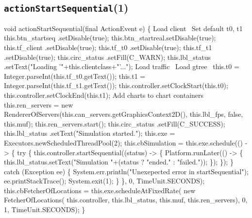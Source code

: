 \subsection{\texttt{actionStartSequential}(1)}
\nwenddocs{}\endmoddef{}
void actionStartSequential(final ActionEvent e) \{
  \LA{}Load client~{\nwtagstyle{}}\RA{}
  \LA{}Set default t0, t1~{\nwtagstyle{}}\RA{}
  this.btn_startseq .setDisable(true);
  this.btn_startreal.setDisable(true);
  this.tf_client     .setDisable(true);
  this.tf_t0        .setDisable(true);
  this.tf_t1        .setDisable(true);
  this.circ_status  .setFill(C_WARN);
  this.lbl_status   .setText("Loading '"+this.clientclass+"'...");
  \LA{}Load traffic~{\nwtagstyle{}}\RA{}
  \LA{}Load gtree~{\nwtagstyle{}}\RA{}
  this.t0 = Integer.parseInt(this.tf_t0.getText());
  this.t1 = Integer.parseInt(this.tf_t1.getText());
  this.controller.setClockStart(this.t0);
  this.controller.setClockEnd(this.t1);
  \LA{}Add charts to chart containers~{\nwtagstyle{}}\RA{}
  this.ren_servers = new RendererOfServers(this.can_servers.getGraphicsContext2D(), this.lbl_fps, false, this.muf);
  this.ren_servers.start();
  this.circ_status  .setFill(C_SUCCESS);
  this.lbl_status   .setText("Simulation started.");
  this.exe = Executors.newScheduledThreadPool(2);
  this.cbSimulation = this.exe.schedule(() -> \{
    try \{
      this.controller.startSequential((status) -> \{
        Platform.runLater(() -> \{
          this.lbl_status.setText("Simulation "+(status ? "ended." : "failed."));
        \});
      \});
    \} catch (Exception ee) \{
      System.err.println("Unexepected error in startSequential");
      ee.printStackTrace();
      System.exit(1);
    \}
  \}, 0, TimeUnit.SECONDS);
  this.cbFetcherOfLocations = this.exe.scheduleAtFixedRate(
      new FetcherOfLocations(
        this.controller, this.lbl_status, this.muf, this.ren_servers), 0, 1, TimeUnit.SECONDS);
\}
\eatline
{}\nwendcode{}\nwdocspar
